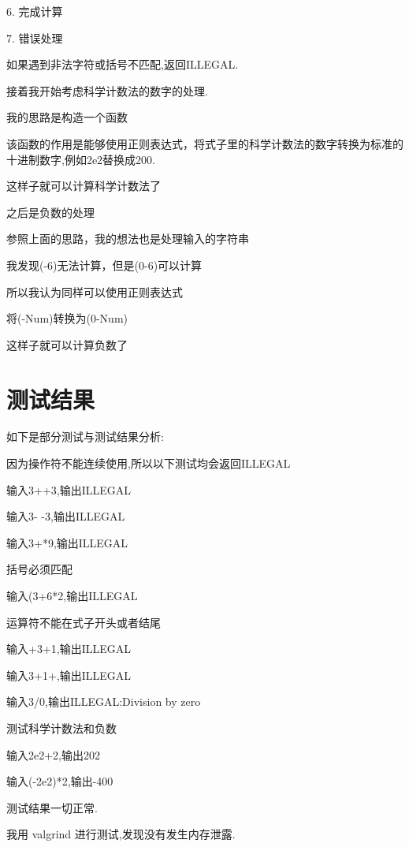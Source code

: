 \documentclass[UTF8]{ctexart}
\begin{document}
6. 完成计算



7. 错误处理

如果遇到非法字符或括号不匹配,返回ILLEGAL.



接着我开始考虑科学计数法的数字的处理.


我的思路是构造一个函数

该函数的作用是能够使用正则表达式，将式子里的科学计数法的数字转换为标准的十进制数字,例如2e2替换成200.

这样子就可以计算科学计数法了

之后是负数的处理

参照上面的思路，我的想法也是处理输入的字符串

我发现(-6)无法计算，但是(0-6)可以计算

所以我认为同样可以使用正则表达式

将(-Num)转换为(0-Num)

这样子就可以计算负数了



\section{测试结果}
如下是部分测试与测试结果分析:

因为操作符不能连续使用,所以以下测试均会返回ILLEGAL

输入3++3,输出ILLEGAL

输入3- -3,输出ILLEGAL

输入3+*9,输出ILLEGAL


括号必须匹配

输入(3+6*2,输出ILLEGAL


运算符不能在式子开头或者结尾

输入+3+1,输出ILLEGAL

输入3+1+,输出ILLEGAL



输入3/0,输出ILLEGAL:Division by zero



测试科学计数法和负数

输入2e2+2,输出202

输入(-2e2)*2,输出-400



测试结果一切正常.

我用 valgrind 进行测试,发现没有发生内存泄露.
\end{document}
